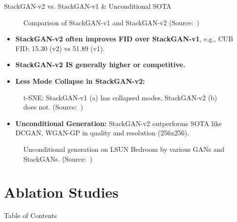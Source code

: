 \documentclass{beamer}
\newcommand{\paperfigure}[3][width=\textwidth]{%
    \begin{figure}%
        \centering%
        \caption{#3 (Source:~\cite{stackgan++})}%
        \label{fig:#2}%
    \end{figure}%
}
\newcommand{\papertable}[3][width=\textwidth]{%
    \begin{figure}%
        \centering%
        \caption{#3 (Source:~\cite{stackgan++})}%
        \label{tab:#2}%
    \end{figure}%
}
\begin{document}
\begin{frame}{StackGAN-v2 vs. StackGAN-v1 \& Unconditional SOTA}
    \papertable[width=\textwidth]{table3_v1_vs_v2}{Comparison of StackGAN-v1 and StackGAN-v2}
    \begin{itemize}
        \item \textbf{StackGAN-v2 often improves FID over StackGAN-v1}, e.g., CUB FID: 15.30 (v2) vs 51.89 (v1).
        \item \textbf{StackGAN-v2 IS generally higher or competitive.}
        \item \textbf{Less Mode Collapse in StackGAN-v2:}
    \end{itemize}
    \paperfigure[width=0.8\textwidth]{fig5_tsne_mode_collapse}{t-SNE: StackGAN-v1 (a) has collapsed modes, StackGAN-v2 (b) does not.}
    \begin{itemize}
        \item \textbf{Unconditional Generation:} StackGAN-v2 outperforms SOTA like DCGAN, WGAN-GP in quality and resolution (256x256).
    \end{itemize}
    \paperfigure[width=\textwidth]{fig6_unconditional_lsun}{Unconditional generation on LSUN Bedroom by various GANs and StackGANs.}
\end{frame}

\section{Ablation Studies}
\begin{frame}{Table of Contents}
    \tableofcontents[currentsection]
\end{frame}
\end{document}
